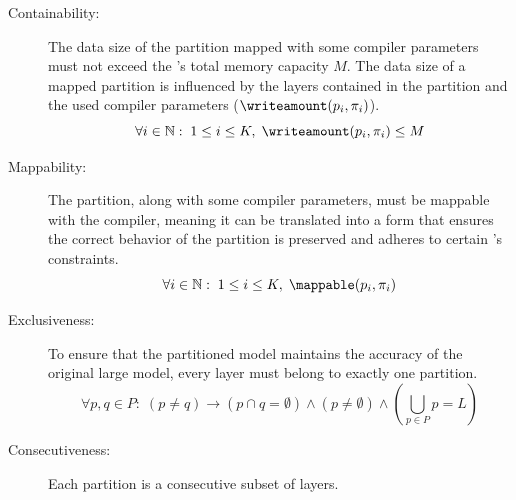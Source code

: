\begin{description}
    \item[Containability:]
    The data size of the partition mapped with some compiler parameters must not exceed the \graicore{}'s total memory capacity $M$.
        The data size of a mapped partition is influenced by the layers contained in the partition and the used compiler parameters ($\writeamount(p_i, \pi_i)$).
    \begin{equation}
        \forall i \in \mathbb{N}: \; 1 \leq i \leq K, \; \writeamount(p_i, \pi_i) \leq M
    \end{equation}
    \item[Mappability:]
    The partition, along with some compiler parameters, must be mappable with the compiler, meaning it can be translated into a form that ensures the correct behavior of the partition is preserved and adheres to certain \graicore{}'s constraints.
    \begin{equation}
        \forall i \in \mathbb{N}: \; 1 \leq i \leq K, \; \mappable(p_i, \pi_i)
    \end{equation}
    \item[Exclusiveness:]
    To ensure that the partitioned model maintains the accuracy of the original large model, every layer must belong to exactly one partition.
    \begin{equation}
        \forall p, q \in P: \; (p \neq q) \rightarrow (p \cap q = \emptyset) \wedge (p \neq \emptyset) \wedge (\bigcup_{p \in P} p = L)
    \end{equation}
    \item[Consecutiveness:]
    Each partition is a consecutive subset of layers.

\end{description}
